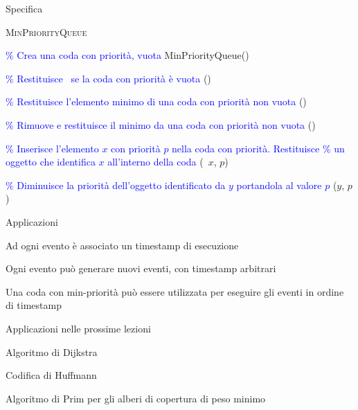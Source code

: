 \begin{frame}[shrink=8]{Specifica}

\vspace{-12pt}
\begin{Procedure}
\caption[A]{\textsc{MinPriorityQueue}}

\BlankLine
\textcolor{blue}{\% Crea una coda con priorità, vuota}\;
\textsf{MinPriorityQueue}()\;

\BlankLine
\textcolor{blue}{\% Restituisce \TRUE\ se la coda con priorità è vuota}\;
\BOOLEAN \setempty()\; 

\BlankLine
\textcolor{blue}{\% Restituisce l'elemento minimo di una coda con priorità non vuota}\;
\Item \heapmin()\;

\BlankLine
\textcolor{blue}{\% Rimuove e restituisce il minimo da una coda con priorità non vuota}\;
\Item \heapdeletemin()\;
 
\BlankLine
\textcolor{blue}{\% Inserisce l'elemento $x$ con priorità $p$ nella coda con priorità. Restituisce}\;
\textcolor{blue}{\% un oggetto \PriorityItem che identifica $x$ all'interno della coda}\;
\PriorityItem \heapinsert(\Item\ $x$, \INTEGER $p$)\;

\BlankLine
\textcolor{blue}{\% Diminuisce la priorità dell'oggetto identificato da $y$ portandola al valore $p$}\;
\heapdecrease(\PriorityItem $y$, \INTEGER $p$)\;

\BlankLine
\end{Procedure}

\end{frame}

\begin{frame}{Applicazioni}

\BIL
\item Ad ogni evento è associato un timestamp di esecuzione
\item Ogni evento può generare nuovi eventi, con timestamp arbitrari
\item Una coda con min-priorità può essere utilizzata per eseguire gli eventi in ordine di timestamp
\EIL




\end{frame}

\begin{frame}{Applicazioni nelle prossime lezioni}
\BIL
\item Algoritmo di Dijkstra
\item Codifica di Huffmann
\item Algoritmo di Prim per gli alberi di copertura di peso minimo
\EIL
\end{frame}



